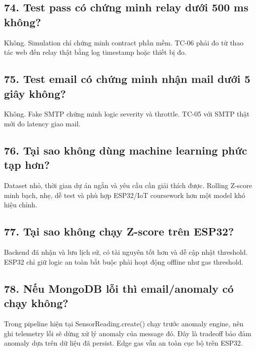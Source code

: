 \documentclass[11pt,oneside,openany]{book}
\renewcommand{\texttt}[1]{{\ttfamily\small #1}}
\begin{document}
\subsection{74. Test pass có chứng minh relay dưới 500 ms
không?}\label{74-test-pass-cuxf3-chux1ee9ng-minh-relay-dux1b0ux1edbi-500-ms-khuxf4ng}

Không. Simulation chỉ chứng minh contract phần mềm. TC-06 phải đo từ
thao tác web đến relay thật bằng log timestamp hoặc thiết bị đo.

\subsection{75. Test email có chứng minh nhận mail dưới 5 giây
không?}\label{75-test-email-cuxf3-chux1ee9ng-minh-nhux1eadn-mail-dux1b0ux1edbi-5-giuxe2y-khuxf4ng}

Không. Fake SMTP chứng minh logic severity và throttle. TC-05 với SMTP
thật mới đo latency giao mail.

\subsection{76. Tại sao không dùng machine learning phức tạp
hơn?}\label{76-tux1ea1i-sao-khuxf4ng-duxf9ng-machine-learning-phux1ee9c-tux1ea1p-hux1a1n}

Dataset nhỏ, thời gian dự án ngắn và yêu cầu cần giải thích được.
Rolling Z-score minh bạch, nhẹ, dễ test và phù hợp ESP32/IoT coursework
hơn một model khó hiệu chỉnh.

\subsection{77. Tại sao không chạy Z-score trên
ESP32?}\label{77-tux1ea1i-sao-khuxf4ng-chux1ea1y-z-score-truxean-esp32}

Backend đã nhận và lưu lịch sử, có tài nguyên tốt hơn và dễ cập nhật
threshold. ESP32 chỉ giữ logic an toàn bắt buộc phải hoạt động offline
như gas threshold.

\subsection{78. Nếu MongoDB lỗi thì email/anomaly có chạy
không?}\label{78-nux1ebfu-mongodb-lux1ed7i-thuxec-emailanomaly-cuxf3-chux1ea1y-khuxf4ng}

Trong pipeline hiện tại \texttt{SensorReading.create()} chạy trước
anomaly engine, nên ghi telemetry lỗi sẽ dừng xử lý anomaly của message
đó. Đây là tradeoff bảo đảm anomaly dựa trên dữ liệu đã persist. Edge
gas vẫn an toàn cục bộ trên ESP32.
\end{document}

